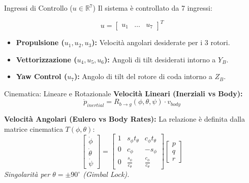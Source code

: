 \documentclass[aspectratio=169]{beamer} %
\begin{document}
\begin{frame}{Ingressi di Controllo ($u \in \mathbb{R}^7$)}
    Il sistema è controllato da 7 ingressi:
    
    \begin{equation*}
        u = \begin{bmatrix} u_1 & \dots & u_7 \end{bmatrix}^T
    \end{equation*}
    
    \begin{itemize}
        \item \textbf{Propulsione ($u_1, u_2, u_3$):} Velocità angolari desiderate per i 3 rotori.
        \item \textbf{Vettorizzazione ($u_4, u_5, u_6$):} Angoli di tilt desiderati intorno a $Y_B$.
        \item \textbf{Yaw Control ($u_7$):} Angolo di tilt del rotore di coda intorno a $Z_B$.
    \end{itemize}
\end{frame}

\begin{frame}{Cinematica: Lineare e Rotazionale}
    \textbf{Velocità Lineari (Inerziali vs Body):}
    \begin{equation}
        \dot{p}_{inertial} = R_{b\rightarrow g}(\phi, \theta, \psi) \cdot v_{body}
    \end{equation}
    
    \textbf{Velocità Angolari (Eulero vs Body Rates):}
    La relazione è definita dalla matrice cinematica $T(\phi, \theta)$:
    \begin{equation}
        \begin{bmatrix} \dot{\phi} \\ \dot{\theta} \\ \dot{\psi} \end{bmatrix} = 
        \begin{bmatrix}
        1 & s_\phi t_\theta & c_\phi t_\theta \\
        0 & c_\phi & -s_\phi \\
        0 & \frac{s_\phi}{c_\theta} & \frac{c_\phi}{c_\theta}
        \end{bmatrix}
        \begin{bmatrix} p \\ q \\ r \end{bmatrix}
    \end{equation}
    \footnotesize{\textit{Singolarità per $\theta = \pm 90^\circ$ (Gimbal Lock).}}
\end{frame}
\end{document}
